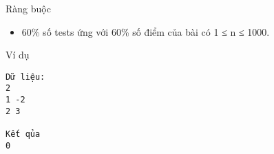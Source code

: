 Ràng buộc
\begin{itemize}
	\item 60\% số tests ứng với 60\% số điểm của bài có 1 ≤ n ≤ 1000.
\end{itemize}
Ví dụ
\begin{verbatim}
Dữ liệu:
2
1 -2
2 3

Kết qủa
0
\end{verbatim}